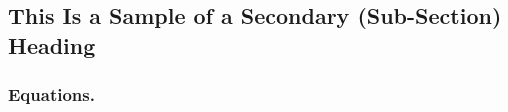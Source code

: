 \documentclass[letterpaper, preprint, paper,11pt]{AAS}	%
\begin{document}
%




\subsection{This Is a Sample of a Secondary (Sub-Section) Heading}

\subsubsection{Equations.} 
\end{document}
